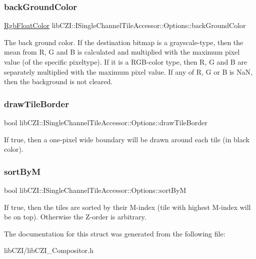 \subsubsection{\texorpdfstring{back\+Ground\+Color}{backGroundColor}}
{\footnotesize\ttfamily \hyperlink{structlib_c_z_i_1_1_rgb_float_color}{Rgb\+Float\+Color} lib\+C\+Z\+I\+::\+I\+Single\+Channel\+Tile\+Accessor\+::\+Options\+::back\+Ground\+Color}

The back ground color. If the destination bitmap is a grayscale-\/type, then the mean from R, G and B is calculated and multiplied with the maximum pixel value (of the specific pixeltype). If it is a R\+G\+B-\/color type, then R, G and B are separately multiplied with the maximum pixel value. If any of R, G or B is NaN, then the background is not cleared. \mbox{\label{structlib_c_z_i_1_1_i_single_channel_tile_accessor_1_1_options_aa1d7947be1a24339a446efbeb371d34d}} 
\subsubsection{\texorpdfstring{draw\+Tile\+Border}{drawTileBorder}}
{\footnotesize\ttfamily bool lib\+C\+Z\+I\+::\+I\+Single\+Channel\+Tile\+Accessor\+::\+Options\+::draw\+Tile\+Border}

If true, then a one-\/pixel wide boundary will be drawn around each tile (in black color). \mbox{\label{structlib_c_z_i_1_1_i_single_channel_tile_accessor_1_1_options_a6825901b1c28cff524d5eec48a2ceea3}} 
\subsubsection{\texorpdfstring{sort\+ByM}{sortByM}}
{\footnotesize\ttfamily bool lib\+C\+Z\+I\+::\+I\+Single\+Channel\+Tile\+Accessor\+::\+Options\+::sort\+ByM}

If true, then the tiles are sorted by their M-\/index (tile with highest M-\/index will be \textquotesingle{}on top\textquotesingle{}). Otherwise the Z-\/order is arbitrary. 

The documentation for this struct was generated from the following file\+:\begin{DoxyCompactItemize}
\item 
lib\+C\+Z\+I/lib\+C\+Z\+I\+\_\+\+Compositor.\+h\end{DoxyCompactItemize}
